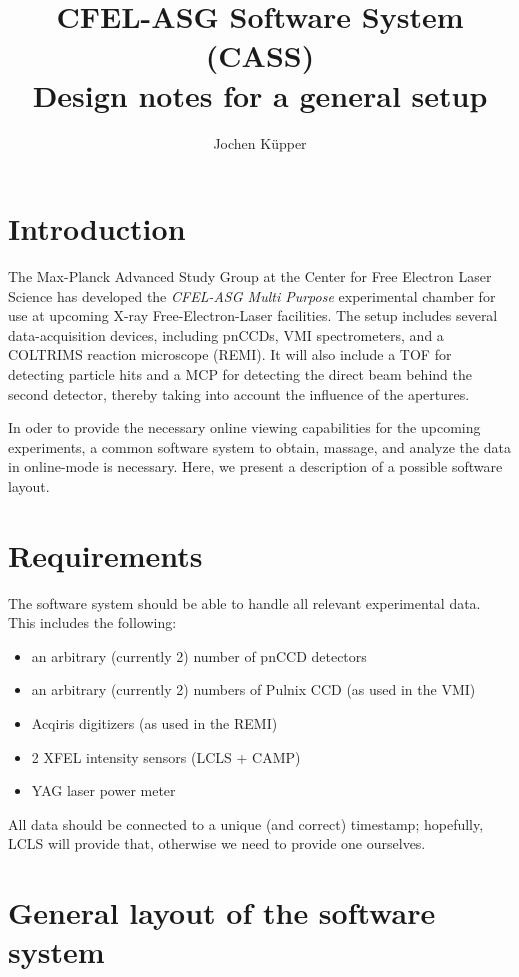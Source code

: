 \documentclass[11pt,a4paper,twoside]{article}
\begin{document}
\title{CFEL-ASG Software System (CASS) \\
   Design notes for a general setup}
\author{Jochen Küpper}
\maketitle

\section{Introduction}
\label{sec:introduction}

The Max-Planck Advanced Study Group at the Center for Free Electron Laser Science has developed the
\emph{CFEL-ASG Multi Purpose} experimental chamber for use at upcoming X-ray Free-Electron-Laser
facilities. The setup includes several data-acquisition devices, including pnCCDs, VMI
spectrometers, and a COLTRIMS reaction microscope (REMI). It will also include a TOF for detecting
particle hits and a MCP for detecting the direct beam behind the second detector, thereby taking
into account the influence of the apertures.

In oder to provide the necessary online viewing capabilities for the upcoming experiments, a common
software system to obtain, massage, and analyze the data in online-mode is necessary. Here, we
present a description of a possible software layout.


\section{Requirements}
\label{sec:requirements}

The software system should be able to handle all relevant experimental data. This includes the
following:
\begin{itemize}
\item an arbitrary (currently 2) number of pnCCD detectors
\item an arbitrary (currently 2) numbers of Pulnix CCD (as used in the VMI)
\item Acqiris digitizers (as used in the REMI)
\item 2 XFEL intensity sensors (LCLS + CAMP)
\item YAG laser power meter
\end{itemize}
All data should be connected to a unique (and correct) timestamp; hopefully, LCLS will provide that,
otherwise we need to provide one ourselves.


\section{General layout of the software system}
\label{sec:general-layout}
\end{document}
